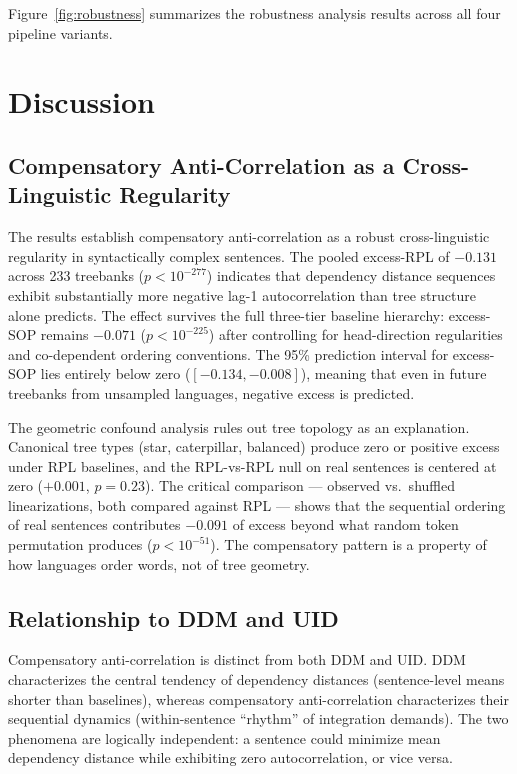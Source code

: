 \documentclass[11pt,letterpaper]{article}
\begin{document}
Figure~\ref{fig:robustness} summarizes the robustness analysis results across all four pipeline variants.

\section{Discussion}

\subsection{Compensatory Anti-Correlation as a Cross-Linguistic Regularity}

The results establish compensatory anti-correlation as a robust cross-linguistic regularity in syntactically complex sentences. The pooled excess-RPL of $-0.131$ across 233 treebanks ($p < 10^{-277}$) indicates that dependency distance sequences exhibit substantially more negative lag-1 autocorrelation than tree structure alone predicts. The effect survives the full three-tier baseline hierarchy: excess-SOP remains $-0.071$ ($p < 10^{-225}$) after controlling for head-direction regularities and co-dependent ordering conventions. The 95\% prediction interval for excess-SOP lies entirely below zero ($[-0.134, -0.008]$), meaning that even in future treebanks from unsampled languages, negative excess is predicted.

The geometric confound analysis rules out tree topology as an explanation. Canonical tree types (star, caterpillar, balanced) produce zero or positive excess under RPL baselines, and the RPL-vs-RPL null on real sentences is centered at zero ($+0.001$, $p = 0.23$). The critical comparison --- observed vs.\ shuffled linearizations, both compared against RPL --- shows that the sequential ordering of real sentences contributes $-0.091$ of excess beyond what random token permutation produces ($p < 10^{-51}$). The compensatory pattern is a property of how languages order words, not of tree geometry.

\subsection{Relationship to DDM and UID}

Compensatory anti-correlation is distinct from both DDM and UID. DDM characterizes the central tendency of dependency distances (sentence-level means shorter than baselines), whereas compensatory anti-correlation characterizes their sequential dynamics (within-sentence ``rhythm'' of integration demands). The two phenomena are logically independent: a sentence could minimize mean dependency distance while exhibiting zero autocorrelation, or vice versa.
\end{document}
